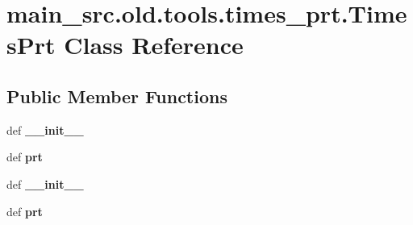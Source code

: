 \hypertarget{classmain__src_8old_1_1tools_1_1times__prt_1_1TimesPrt}{\section{main\-\_\-src.\-old.\-tools.\-times\-\_\-prt.\-Times\-Prt Class Reference}
\label{classmain__src_8old_1_1tools_1_1times__prt_1_1TimesPrt}
}
\subsection*{Public Member Functions}
\begin{DoxyCompactItemize}
\item 
\hypertarget{classmain__src_8old_1_1tools_1_1times__prt_1_1TimesPrt_abf74399349f37772e5ed2ee0a34f01cf}{def {\bfseries \-\_\-\-\_\-init\-\_\-\-\_\-}}\label{classmain__src_8old_1_1tools_1_1times__prt_1_1TimesPrt_abf74399349f37772e5ed2ee0a34f01cf}

\item 
\hypertarget{classmain__src_8old_1_1tools_1_1times__prt_1_1TimesPrt_ab707747a1631a1bcbd554983730beacc}{def {\bfseries prt}}\label{classmain__src_8old_1_1tools_1_1times__prt_1_1TimesPrt_ab707747a1631a1bcbd554983730beacc}

\item 
\hypertarget{classmain__src_8old_1_1tools_1_1times__prt_1_1TimesPrt_abf74399349f37772e5ed2ee0a34f01cf}{def {\bfseries \-\_\-\-\_\-init\-\_\-\-\_\-}}\label{classmain__src_8old_1_1tools_1_1times__prt_1_1TimesPrt_abf74399349f37772e5ed2ee0a34f01cf}

\item 
\hypertarget{classmain__src_8old_1_1tools_1_1times__prt_1_1TimesPrt_ab707747a1631a1bcbd554983730beacc}{def {\bfseries prt}}\label{classmain__src_8old_1_1tools_1_1times__prt_1_1TimesPrt_ab707747a1631a1bcbd554983730beacc}

\end{DoxyCompactItemize}
